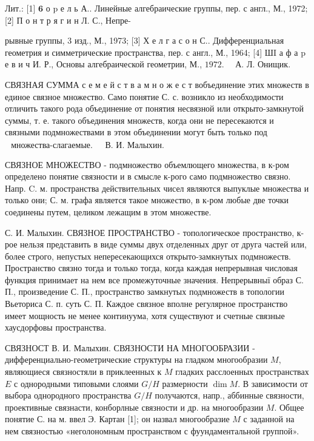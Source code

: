 \documentclass[10pt]{article}
\begin{document}
Лит.: [1] $\mathbf{6}$ о $\mathrm{p}$ е л ь А.. Линейные алгебраические группы, пер. с англ., М., 1972; [2] П о н т р я г и н Л. С., Непре-

рывные группы, 3 изд., М., 1973; [3] Х е л г а с о н С.. Дифференциальная геометрия и симметрические пространства, пер. с англ., М., 1964; [4] ШI а ф а $\mathrm{p}$ е в и ч И. Р., Основы алгебраической геометрии, М., $1972 . \quad$ А. Л. Онищик.



СВЯЗНАЯ СУММА с е м е й с т в а м н о ж е с т вобъединение этих множеств в единое связное множество. Само понятие С. с. возникло из необходимости отличить такого рода объединение от понятия несвязной или открыто-замкнутой суммы, т. е. такого объединения множеств, когда они не пересекаются и связными подмножествами в этом объединении могут быть только под$\begin{array}{ll}\text { множества-слагаемые. } & \text { В. И. Малыхин. }\end{array}$



СВЯЗНОЕ МНОЖЕСТВО - подмножество объемлющего множества, в к-ром определено понятие связности и в смысле к-рого само подмножество связно. Напр. C. м. пространства действительных чисел являются выпуклые множества и только они; С. м. графа является такое множество, в к-ром любые две точки соединены путем, целиком лежащим в этом множестве.



С. И. Малыхин. СВЯЗНОЕ ПРОСТРАНСТВО - топологическое пространство, к-рое нельзя представить в виде суммы двух отделенных друг от друга частей или, более строго, непустых непересекающихся открыто-замкнутых подмножеств. Пространство связно тогда и только тогда, когда каждая непрерывная числовая функция принимает на нем все промежуточные значения. Непрерывныї образ С. П., произведение С. П., пространство замкнутых подмножеств в топологии Вьеториса С. п. суть С. П. Каждое связное вполне регулярное пространство имеет мощность не менее континуума, хотя существуют и счетные связные хаусдорфовы пространства.



СВЯЗНОСТ В. И. Малыхин. СВЯЗНОСТИ НА МНОГООБРАЗИИ - дифференциально-геометрические структуры на гладком многообразии $M$, являющиеся связностяли в приклеенных к $M$ гладких расслоенных пространствах $E$ с однородными типовыми слоями $G / H$ размерности $\operatorname{dim} M$. В зависимости от выбора однородного пространства $G / H$ получаются, напр., аббинные связности, проективные связнасти, конборлные связности и др. на многообразии $M$. Общее понятие С. на м. ввел Э. Картан [1]; он назвал многообразие $M$ с заданной на нем связностью «неголономным пространством с фуундаментальной группой».
\end{document}
